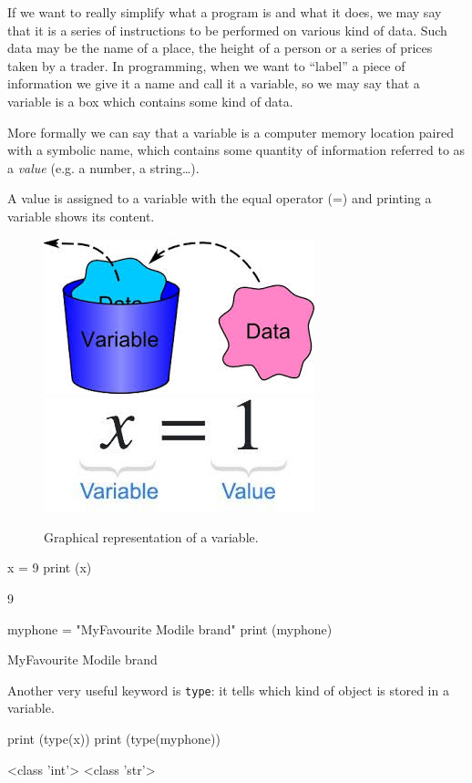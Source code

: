 If we want to really simplify what a program is and what it does, we may say that it is a series of instructions to be performed on various kind of data. Such data may be the name of a place, the height of a person or a series of prices taken by a trader. In programming, when we want to “label” a piece of information we give it a name and call it a variable, so we may say that a variable is a box which contains some kind of data.

More formally we can say that a variable is a computer memory location paired with a symbolic name, which contains some quantity of information referred to as a \emph{value} (e.g. a number, a string\ldots). 

A value is assigned to a variable with the equal operator (=) and printing a variable shows its content. 

\begin{figure}[h]
\centering
\includegraphics[width=0.35\linewidth]{figures/var1.jpeg}\\
\includegraphics[width=0.35\linewidth]{figures/var2.jpeg}
\caption{Graphical representation of a variable.}
\end{figure}

\begin{ipythonnon}
x = 9 
print (x)
\end{ipythonnon}
\begin{ioutput}
9
\end{ioutput}
\begin{ipythonnon}
myphone = "MyFavourite Modile brand" 
print (myphone)
\end{ipythonnon}
\begin{ioutput}
MyFavourite Modile brand
\end{ioutput}

Another very useful keyword is \texttt{type}: it tells which kind of object is stored in a variable.

\begin{ipythonnon}
print (type(x))
print (type(myphone))
\end{ipythonnon}
\begin{ioutput}
<class 'int'>
<class 'str'>
\end{ioutput}

